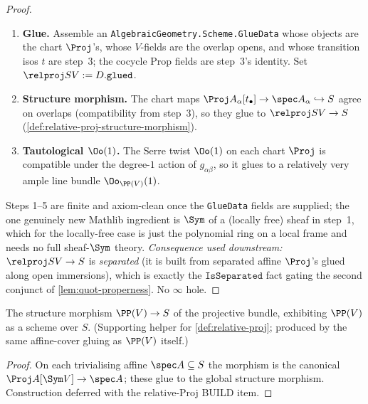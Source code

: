 \begin{proof}
\begin{enumerate}
      graded-ring $\Proj$ over the overlap $\spec A_{\alpha\beta}$. This is the
      exact analogue of the matrix-formula transition maps used for the
      Grassmannian (\cref{def:grassmannian-scheme}); the cocycle identity for the
      $g_{\alpha\beta}$ is the matrix cocycle (\cref{lem:grassmannian-cocycle}
      pattern: products of invertibles, \texttt{convert} on the embedded
      \texttt{Invertible} obligation).
    \item \textbf{Glue.} Assemble an \texttt{AlgebraicGeometry.Scheme.GlueData}
      whose objects are the chart $\Proj$'s, whose $V$-fields are the overlap
      opens, and whose transition isos $t$ are step~3; the cocycle Prop fields are
      step~3's identity. Set $\relproj S V := D.\mathtt{glued}$.
    \item \textbf{Structure morphism.} The chart maps $\Proj A_\alpha[t_\bullet]
      \to\spec A_\alpha\hookrightarrow S$ agree on overlaps (compatibility from
      step~3), so they glue to $\relproj S V\to S$
      (\cref{def:relative-proj-structure-morphism}).
    \item \textbf{Tautological $\Oo(1)$.} The Serre twist $\Oo(1)$ on each chart
      $\Proj$ is compatible under the degree-$1$ action of $g_{\alpha\beta}$, so it
      glues to a relatively very ample line bundle $\Oo_{\PP(V)}(1)$.
  \end{enumerate}
  Steps 1--5 are finite and axiom-clean once the \texttt{GlueData} fields are
  supplied; the one genuinely new Mathlib ingredient is $\Sym$ of a (locally free)
  sheaf in step~1, which for the locally-free case is just the polynomial ring on a
  local frame and needs no full sheaf-$\Sym$ theory. \emph{Consequence used
  downstream:} $\relproj S V\to S$ is \emph{separated} (it is built from
  separated affine $\Proj$'s glued along open immersions), which is exactly the
  $\texttt{IsSeparated}$ fact gating the second conjunct of
  \cref{lem:quot-properness}. No $\infty$ hole.
\end{proof}

\begin{definition}

  \label{def:relative-proj-structure-morphism}
  The structure morphism $\PP(V) \to S$ of the projective bundle, exhibiting
  $\PP(V)$ as a scheme over $S$. (Supporting helper for \ref{def:relative-proj};
  produced by the same affine-cover gluing as $\PP(V)$ itself.)
\end{definition}
\begin{proof}
  On each trivialising affine $\spec A \subseteq S$ the morphism is the canonical
  $\Proj A[\Sym V] \to \spec A$; these glue to the global structure morphism.
  Construction deferred with the relative-Proj BUILD item.
\end{proof}

